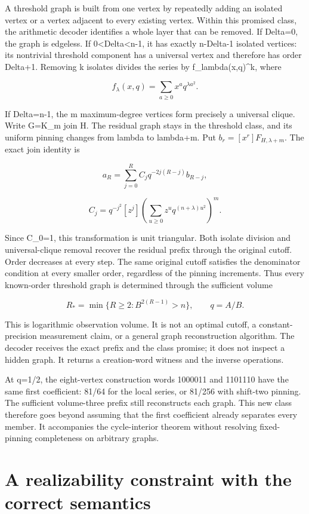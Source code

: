 \documentclass[
  11pt,
  a4paper,
]{report}
\begin{document}
A threshold graph is built from one vertex by repeatedly adding an
isolated vertex or a vertex adjacent to every existing vertex. Within
this promised class, the arithmetic decoder identifies a whole layer
that can be removed. If Delta=0, the graph is edgeless. If
0\textless Delta\textless n-1, it has exactly n-Delta-1 isolated
vertices: its nontrivial threshold component has a universal vertex and
therefore has order Delta+1. Removing k isolates divides the series by
f\_lambda(x,q)\^{}k, where

\[
 f_\lambda(x,q)=\sum_{a\ge0}x^a q^{\lambda a^2}.
\]

If Delta=n-1, the m maximum-degree vertices form precisely a universal
clique. Write G=K\_m join H. The residual graph stays in the threshold
class, and its uniform pinning changes from lambda to lambda+m. Put
\(b_r=[x^r]F_{H,\lambda+m}\). The exact join identity is

\[
 a_R=\sum_{j=0}^R C_j q^{-2j(R-j)}b_{R-j},
\]

\[
 C_j=q^{-j^2}[z^j]
 \left(\sum_{u\ge0}z^u q^{(n+\lambda)u^2}\right)^m.
\]

Since C\_0=1, this transformation is unit triangular. Both isolate
division and universal-clique removal recover the residual prefix
through the original cutoff. Order decreases at every step. The same
original cutoff satisfies the denominator condition at every smaller
order, regardless of the pinning increments. Thus every known-order
threshold graph is determined through the sufficient volume

\[
 R_* =\min\{R\ge2:B^{2(R-1)}>n\},\qquad q=A/B.
\]

This is logarithmic observation volume. It is not an optimal cutoff, a
constant-precision measurement claim, or a general graph reconstruction
algorithm. The decoder receives the exact prefix and the class promise;
it does not inspect a hidden graph. It returns a creation-word witness
and the inverse operations.

At q=1/2, the eight-vertex construction words 1000011 and 1101110 have
the same first coefficient: 81/64 for the local series, or 81/256 with
shift-two pinning. The sufficient volume-three prefix still reconstructs
each graph. This new class therefore goes beyond assuming that the first
coefficient already separates every member. It accompanies the
cycle-interior theorem without resolving fixed-pinning completeness on
arbitrary graphs.

\hypertarget{a-realizability-constraint-with-the-correct-semantics}{%
\section{A realizability constraint with the correct
semantics}\label{a-realizability-constraint-with-the-correct-semantics}}
\end{document}
